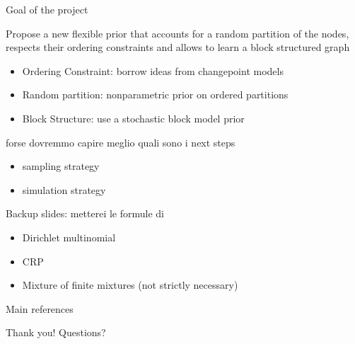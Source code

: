 \begin{frame}{Goal of the project}

Propose a \alert{new flexible prior that accounts for a random partition of the nodes}, respects their ordering constraints and allows to learn a block structured graph

 \begin{itemize}
     \item Ordering Constraint: borrow ideas from changepoint models
     \item Random partition: nonparametric prior on ordered partitions
     \item Block Structure: use a stochastic block model prior
 \end{itemize}

forse dovremmo capire meglio quali sono i next steps

\begin{itemize}
    \item sampling strategy
    \item simulation strategy
\end{itemize}

Backup slides: metterei le formule di 
\begin{itemize}
    \item Dirichlet multinomial
    \item CRP
    \item Mixture of finite mixtures (not strictly necessary)

\end{itemize} 
\end{frame}



\begin{frame}{Main references}
    \nocite{colombiLearningBlockStructured2022a}
    \nocite{mohammadiBayesianStructureLearning2015a}
    \nocite{legramantiExtendedStochasticBlock2022}
    \nocite{bensonAdaptiveMCMCMultiple2018}
    \nocite{martinezNonparametricChangePoint2014}
    
    \renewcommand*{\bibfont}{\small}
    \printbibliography
\end{frame}

\begin{frame}
    Thank you!
    \pause
    Questions?
\end{frame}
